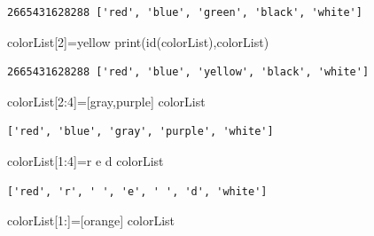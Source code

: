 \documentclass[
  letterpaper,
  DIV=11,
  numbers=noendperiod]{scrreprt}
\newenvironment{Shaded}{\begin{snugshade}}{\end{snugshade}}
\newcommand{\BuiltInTok}[1]{\textcolor[rgb]{0.00,0.23,0.31}{#1}}
\newcommand{\DecValTok}[1]{\textcolor[rgb]{0.68,0.00,0.00}{#1}}
\newcommand{\NormalTok}[1]{\textcolor[rgb]{0.00,0.23,0.31}{#1}}
\newcommand{\OperatorTok}[1]{\textcolor[rgb]{0.37,0.37,0.37}{#1}}
\newcommand{\StringTok}[1]{\textcolor[rgb]{0.13,0.47,0.30}{#1}}
\begin{document}
\begin{verbatim}
2665431628288 ['red', 'blue', 'green', 'black', 'white']
\end{verbatim}

\begin{Shaded}
\begin{Highlighting}[]
\NormalTok{colorList[}\DecValTok{2}\NormalTok{]}\OperatorTok{=}\StringTok{\textquotesingle{}yellow\textquotesingle{}}
\BuiltInTok{print}\NormalTok{(}\BuiltInTok{id}\NormalTok{(colorList),colorList)}
\end{Highlighting}
\end{Shaded}

\begin{verbatim}
2665431628288 ['red', 'blue', 'yellow', 'black', 'white']
\end{verbatim}

\begin{Shaded}
\begin{Highlighting}[]
\NormalTok{colorList[}\DecValTok{2}\NormalTok{:}\DecValTok{4}\NormalTok{]}\OperatorTok{=}\NormalTok{[}\StringTok{\textquotesingle{}gray\textquotesingle{}}\NormalTok{,}\StringTok{\textquotesingle{}purple\textquotesingle{}}\NormalTok{]}
\NormalTok{colorList}
\end{Highlighting}
\end{Shaded}

\begin{verbatim}
['red', 'blue', 'gray', 'purple', 'white']
\end{verbatim}

\begin{Shaded}
\begin{Highlighting}[]
\NormalTok{colorList[}\DecValTok{1}\NormalTok{:}\DecValTok{4}\NormalTok{]}\OperatorTok{=}\StringTok{\textquotesingle{}r e d\textquotesingle{}}
\NormalTok{colorList}
\end{Highlighting}
\end{Shaded}

\begin{verbatim}
['red', 'r', ' ', 'e', ' ', 'd', 'white']
\end{verbatim}

\begin{Shaded}
\begin{Highlighting}[]
\NormalTok{colorList[}\DecValTok{1}\NormalTok{:]}\OperatorTok{=}\NormalTok{[}\StringTok{\textquotesingle{}orange\textquotesingle{}}\NormalTok{]}
\NormalTok{colorList}
\end{Highlighting}
\end{Shaded}
\end{document}
